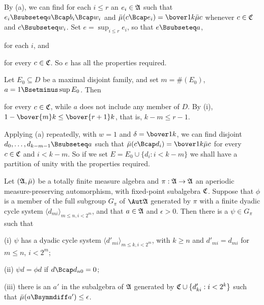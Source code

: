 {By (a), we can find for each $i\le r$ an $e_i\in\frak A$ such that
$e_i\Bsubseteq a\Bcap b_i\Bcap w_i$ and
$\bar\mu(c\Bcap e_i)=\bover1k\bar\mu c$ whenever $c\in\frak C$ and
$c\Bsubseteq w_i$.   Set $e=\sup_{i\le r}e_i$, so that $e\Bsubseteq a$,
     
     
\noindent for each $i$, and
     
     
\noindent for every $c\in\frak C$.   So $e$ has all the properties
required.\ \Qed
     
\medskip
     
 Let $E_0\subseteq D$ be a maximal disjoint family, and
set $m=\#(E_0)$, $a=1\Bsetminus\sup E_0$.   Then
     
     
\noindent for every $c\in\frak C$, while $a$ does not include any member
of $D$.   By (i), $1-\bover{m}k\le\bover{r+1}k$, that is, $k-m\le r-1$.
     
Applying (a) repeatedly, with $w=1$ and $\delta=\bover1k$, we can find
disjoint $d_0,\ldots,d_{k-m-1}\Bsubseteq a$ such that
$\bar\mu(c\Bcap d_i)=\bover1k\bar\mu c$ for every $c\in\frak C$ and
$i<k-m$.   So if we set $E=E_0\cup\{d_i:i<k-m\}$ we shall have a
partition of unity with the properties required.
}%
     
Let $(\frak A,\bar\mu)$ be a totally finite measure algebra and
$\pi:\frak A\to\frak A$ an
aperiodic measure-preserving automorphism, with fixed-point subalgebra
$\frak C$.   Suppose
that $\phi$ is a member of the full subgroup $G_{\pi}$ of $\Aut\frak A$
generated by $\pi$ with a finite dyadic cycle system
$\langle d_{mi}\rangle_{m\le n,i<2^m}$, and that $a\in\frak A$ and
$\epsilon>0$.   Then there is a $\psi\in G_{\pi}$ such that
     
(i) $\psi$ has a dyadic cycle system
$\langle d'_{mi}\rangle_{m\le k,i<2^m}$, with $k\ge n$ and $d'_{mi}
=d_{mi}$ for $m\le n$, $i<2^m$;
     
(ii) $\psi d=\phi d$ if $d\Bcap d_{n0}=0$;
     
(iii) there is an $a'$ in the subalgebra of $\frak A$ generated by
$\frak C\cup\{d'_{ki}:i<2^k\}$ such that
$\bar\mu(a\Bsymmdiff a')\le\epsilon$.
     
